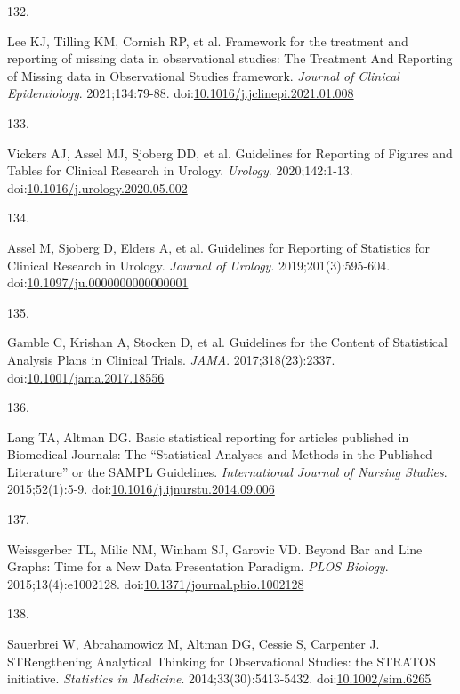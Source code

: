 \documentclass[
]{book}
\newlength{\cslhangindent}
\newlength{\csllabelwidth}
\newlength{\cslentryspacingunit} %
\newenvironment{CSLReferences}[2] %
 {%
  \setlength{\parindent}{0pt}
  \ifodd #1
  \let\oldpar\par
  \def\par{\hangindent=\cslhangindent\oldpar}
  \fi
  \setlength{\parskip}{#2\cslentryspacingunit}
 }%
 {}
\newcommand{\CSLLeftMargin}[1]{\parbox[t]{\csllabelwidth}{#1}}
\newcommand{\CSLRightInline}[1]{\parbox[t]{\linewidth - \csllabelwidth}{#1}\break}
\begin{document}
\begin{CSLReferences}{0}{0}
\leavevmode{}%
\CSLLeftMargin{132. }%
\CSLRightInline{Lee KJ, Tilling KM, Cornish RP, et al. Framework for the treatment and reporting of missing data in observational studies: The Treatment And Reporting of Missing data in Observational Studies framework. \emph{Journal of Clinical Epidemiology}. 2021;134:79-88. doi:\href{https://doi.org/10.1016/j.jclinepi.2021.01.008}{10.1016/j.jclinepi.2021.01.008}}

\leavevmode{}%
\CSLLeftMargin{133. }%
\CSLRightInline{Vickers AJ, Assel MJ, Sjoberg DD, et al. Guidelines for Reporting of Figures and Tables for Clinical Research in Urology. \emph{Urology}. 2020;142:1-13. doi:\href{https://doi.org/10.1016/j.urology.2020.05.002}{10.1016/j.urology.2020.05.002}}

\leavevmode{}%
\CSLLeftMargin{134. }%
\CSLRightInline{Assel M, Sjoberg D, Elders A, et al. Guidelines for Reporting of Statistics for Clinical Research in Urology. \emph{Journal of Urology}. 2019;201(3):595-604. doi:\href{https://doi.org/10.1097/ju.0000000000000001}{10.1097/ju.0000000000000001}}

\leavevmode{}%
\CSLLeftMargin{135. }%
\CSLRightInline{Gamble C, Krishan A, Stocken D, et al. Guidelines for the Content of Statistical Analysis Plans in Clinical Trials. \emph{JAMA}. 2017;318(23):2337. doi:\href{https://doi.org/10.1001/jama.2017.18556}{10.1001/jama.2017.18556}}

\leavevmode{}%
\CSLLeftMargin{136. }%
\CSLRightInline{Lang TA, Altman DG. Basic statistical reporting for articles published in Biomedical Journals: The {``}Statistical Analyses and Methods in the Published Literature{''} or the SAMPL Guidelines. \emph{International Journal of Nursing Studies}. 2015;52(1):5-9. doi:\href{https://doi.org/10.1016/j.ijnurstu.2014.09.006}{10.1016/j.ijnurstu.2014.09.006}}

\leavevmode{}%
\CSLLeftMargin{137. }%
\CSLRightInline{Weissgerber TL, Milic NM, Winham SJ, Garovic VD. Beyond Bar and Line Graphs: Time for a New Data Presentation Paradigm. \emph{PLOS Biology}. 2015;13(4):e1002128. doi:\href{https://doi.org/10.1371/journal.pbio.1002128}{10.1371/journal.pbio.1002128}}

\leavevmode{}%
\CSLLeftMargin{138. }%
\CSLRightInline{Sauerbrei W, Abrahamowicz M, Altman DG, Cessie S, Carpenter J. STRengthening Analytical Thinking for Observational Studies: the STRATOS initiative. \emph{Statistics in Medicine}. 2014;33(30):5413-5432. doi:\href{https://doi.org/10.1002/sim.6265}{10.1002/sim.6265}}


\end{CSLReferences}
\end{document}

